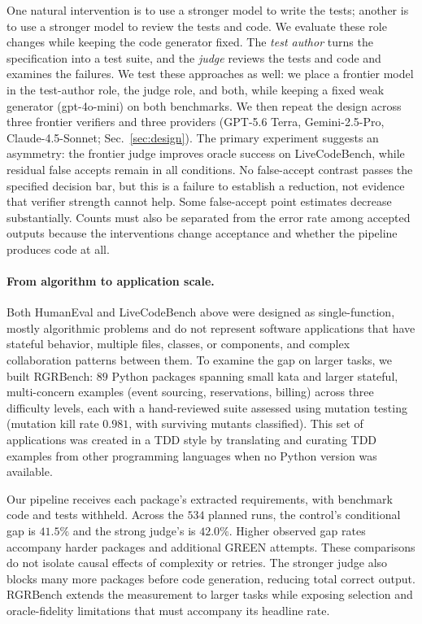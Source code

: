 One natural intervention is to use a stronger model to write the tests; another is to use
a stronger model to review the tests and code. We evaluate these role changes while keeping
the code generator fixed. The \emph{test author} turns the
specification into a test suite, and the \emph{judge} reviews the tests and code and examines the
failures. We test these approaches as well: we place a frontier model in the test-author role, the
judge role, and both, while keeping a fixed weak generator (gpt-4o-mini) on both benchmarks. We
then repeat the design across three frontier verifiers and three providers (GPT-5.6 Terra,
Gemini-2.5-Pro, Claude-4.5-Sonnet; Sec.~\ref{sec:design}). The primary experiment suggests an
asymmetry: the frontier judge improves oracle success on LiveCodeBench, while residual false
accepts remain in all conditions. No false-accept contrast passes the specified decision bar,
but this is a failure to establish a reduction, not evidence that verifier strength cannot
help. Some false-accept point estimates decrease substantially. Counts must also be separated
from the error rate among accepted outputs because the interventions change acceptance and
whether the pipeline produces code at all.

\paragraph{From algorithm to application scale.} Both HumanEval and LiveCodeBench above were
designed as single-function, mostly algorithmic problems and do not represent software applications
that have stateful behavior, multiple files, classes, or components, and complex collaboration
patterns between them. To examine the gap on larger tasks, we
built RGRBench: $89$ Python packages spanning small kata and larger stateful, multi-concern
examples (event sourcing, reservations, billing) across three difficulty levels, each with a hand-reviewed suite assessed
using mutation testing (mutation kill rate $0.981$, with surviving mutants classified). This
set of applications was created in a TDD style by translating and curating TDD examples from other
programming languages when no Python version was available.

Our pipeline receives each package's extracted requirements, with benchmark code and tests
withheld. Across the $534$ planned runs, the control's conditional gap is $41.5\%$ and the
strong judge's is $42.0\%$. Higher observed gap rates accompany harder packages and additional
GREEN attempts. These comparisons do not isolate causal effects of complexity or retries.
The stronger judge also blocks many more packages before code generation, reducing total
correct output. RGRBench extends the measurement to larger tasks while exposing selection
and oracle-fidelity limitations that must accompany its headline rate.

